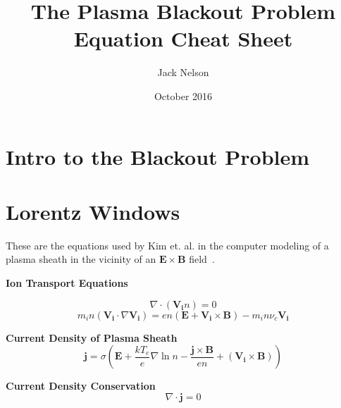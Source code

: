 \documentclass[]{tufte-handout}
\title{The Plasma Blackout Problem Equation Cheat Sheet}
\author{Jack Nelson}
\date{October 2016}
\begin{document}
\maketitle


\section{Intro to the Blackout Problem}

\section{Lorentz Windows}
These are the equations used by Kim et. al. in the computer modeling of a plasma sheath in the vicinity of an $\mathbf{E}\times\mathbf{B}$ field~\cite{kim_analysis_2008}.

\textbf{Ion Transport Equations}

\begin{equation}
	\nabla \cdot (\mathbf{V_i} n) = 0
\end{equation}
\begin{equation}
	m_{ i }n(\mathbf { V_{ i } } \cdot \nabla \mathbf { V_{ i } } )=en(\mathbf { E } +\mathbf { V_{ i } } \times \mathbf { B } )-m_{ i }n\nu _{ c }\mathbf { V_{ i } }
\end{equation}

\textbf{Current Density of Plasma Sheath}
\begin{equation}
	\mathbf{j} = \sigma \left(\mathbf{E} + \frac{kT_e}{e}\nabla \ln n - \frac{\mathbf{j} \times \mathbf{B}}{en} + \left(\mathbf{V_i} \times \mathbf{B}\right)\right)
\end{equation}

\textbf{Current Density Conservation}
\begin{equation}
\nabla \cdot \mathbf{j} = 0
\end{equation}



\end{document}
